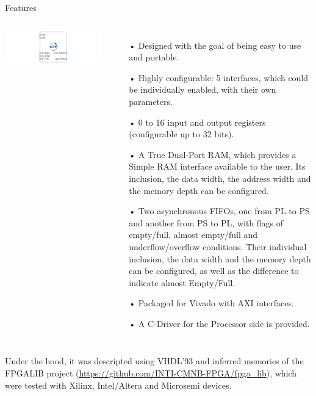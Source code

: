 \documentclass[aspectratio=169]{beamer}
\begin{document}

\begin{frame}{Features}
  \begin{columns}
      \center
      \includegraphics[width=1.0\textwidth, trim={9cm 0 9cm 0}, clip]{../images/component.png}
      \begin{itemize}
        \scriptsize
        \item[•] Designed with the goal of being easy to use and portable.
        \item[•] Highly configurable: 5 interfaces, which could be individually enabled, with their own parameters.
        \item[•] 0 to 16 input and output registers (configurable up to 32 bits).
        \item[•] A True Dual-Port RAM, which provides a Simple RAM interface available to the user. Its inclusion, the data width, the address width and the memory depth can be configured.
        \item[•] Two asynchronous FIFOs, one from PL to PS and another from PS to PL, with flags of empty/full, almost empty/full and underflow/overflow conditions. Their individual inclusion, the data width and the memory depth can be configured, as well as the difference to indicate almost Empty/Full.
        \item[•] Packaged for Vivado with AXI interfaces.
        \item[•] A C-Driver for the Processor side is provided.
      \end{itemize}
  \end{columns}
  \vspace{5mm}
  \tiny\center
  Under the hood, it was descripted using VHDL'93 and inferred memories of the FPGALIB project (\url{https://github.com/INTI-CMNB-FPGA/fpga_lib}), which were tested with Xilinx, Intel/Altera and Microsemi devices.
\end{frame}
\end{document}
